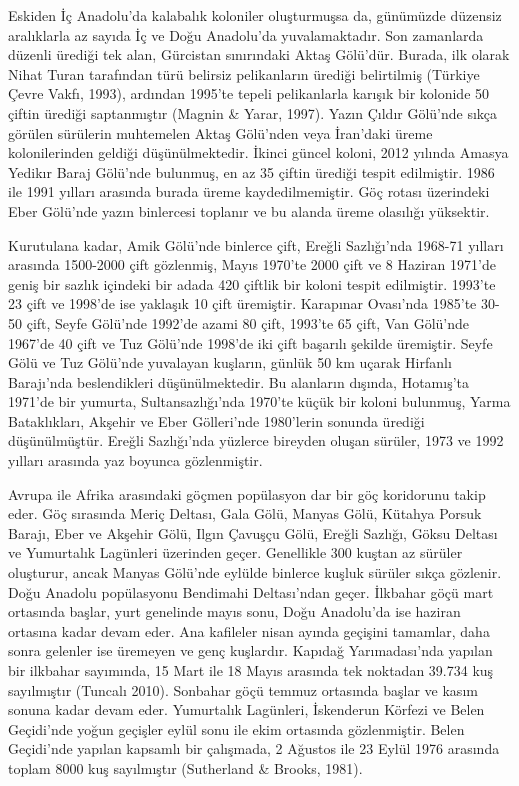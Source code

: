 \documentclass[
  a4paper,
  DIV=11,
  numbers=noendperiod]{scrreprt}
\begin{document}
Eskiden İç Anadolu'da kalabalık koloniler oluşturmuşsa da, günümüzde
düzensiz aralıklarla az sayıda İç ve Doğu Anadolu'da yuvalamaktadır. Son
zamanlarda düzenli ürediği tek alan, Gürcistan sınırındaki Aktaş
Gölü'dür. Burada, ilk olarak Nihat Turan tarafından türü belirsiz
pelikanların ürediği belirtilmiş (Türkiye Çevre Vakfı, 1993), ardından
1995'te tepeli pelikanlarla karışık bir kolonide 50 çiftin ürediği
saptanmıştır (Magnin \& Yarar, 1997). Yazın Çıldır Gölü'nde sıkça
görülen sürülerin muhtemelen Aktaş Gölü'nden veya İran'daki üreme
kolonilerinden geldiği düşünülmektedir. İkinci güncel koloni, 2012
yılında Amasya Yedikır Baraj Gölü'nde bulunmuş, en az 35 çiftin ürediği
tespit edilmiştir. 1986 ile 1991 yılları arasında burada üreme
kaydedilmemiştir. Göç rotası üzerindeki Eber Gölü'nde yazın binlercesi
toplanır ve bu alanda üreme olasılığı yüksektir.

Kurutulana kadar, Amik Gölü'nde binlerce çift, Ereğli Sazlığı'nda
1968-71 yılları arasında 1500-2000 çift gözlenmiş, Mayıs 1970'te 2000
çift ve 8 Haziran 1971'de geniş bir sazlık içindeki bir adada 420
çiftlik bir koloni tespit edilmiştir. 1993'te 23 çift ve 1998'de ise
yaklaşık 10 çift üremiştir. Karapınar Ovası'nda 1985'te 30-50 çift,
Seyfe Gölü'nde 1992'de azami 80 çift, 1993'te 65 çift, Van Gölü'nde
1967'de 40 çift ve Tuz Gölü'nde 1998'de iki çift başarılı şekilde
üremiştir. Seyfe Gölü ve Tuz Gölü'nde yuvalayan kuşların, günlük 50 km
uçarak Hirfanlı Barajı'nda beslendikleri düşünülmektedir. Bu alanların
dışında, Hotamış'ta 1971'de bir yumurta, Sultansazlığı'nda 1970'te küçük
bir koloni bulunmuş, Yarma Bataklıkları, Akşehir ve Eber Gölleri'nde
1980'lerin sonunda ürediği düşünülmüştür. Ereğli Sazlığı'nda yüzlerce
bireyden oluşan sürüler, 1973 ve 1992 yılları arasında yaz boyunca
gözlenmiştir.

Avrupa ile Afrika arasındaki göçmen popülasyon dar bir göç koridorunu
takip eder. Göç sırasında Meriç Deltası, Gala Gölü, Manyas Gölü, Kütahya
Porsuk Barajı, Eber ve Akşehir Gölü, Ilgın Çavuşçu Gölü, Ereğli Sazlığı,
Göksu Deltası ve Yumurtalık Lagünleri üzerinden geçer. Genellikle 300
kuştan az sürüler oluşturur, ancak Manyas Gölü'nde eylülde binlerce
kuşluk sürüler sıkça gözlenir. Doğu Anadolu popülasyonu Bendimahi
Deltası'ndan geçer. İlkbahar göçü mart ortasında başlar, yurt genelinde
mayıs sonu, Doğu Anadolu'da ise haziran ortasına kadar devam eder. Ana
kafileler nisan ayında geçişini tamamlar, daha sonra gelenler ise
üremeyen ve genç kuşlardır. Kapıdağ Yarımadası'nda yapılan bir ilkbahar
sayımında, 15 Mart ile 18 Mayıs arasında tek noktadan 39.734 kuş
sayılmıştır (Tuncalı 2010). Sonbahar göçü temmuz ortasında başlar ve
kasım sonuna kadar devam eder. Yumurtalık Lagünleri, İskenderun Körfezi
ve Belen Geçidi'nde yoğun geçişler eylül sonu ile ekim ortasında
gözlenmiştir. Belen Geçidi'nde yapılan kapsamlı bir çalışmada, 2 Ağustos
ile 23 Eylül 1976 arasında toplam 8000 kuş sayılmıştır (Sutherland \&
Brooks, 1981).
\end{document}
